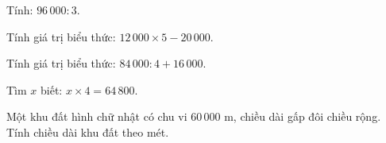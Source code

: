\begin{ex} %
Tính: $96\,000 : 3$.
\end{ex}

\begin{ex} %
Tính giá trị biểu thức: $12\,000 \times 5 - 20\,000$.
\end{ex}

\begin{ex} %
Tính giá trị biểu thức: $84\,000 : 4 + 16\,000$.
\end{ex}

\begin{ex} %
Tìm $x$ biết: $x \times 4 = 64\,800$.
\end{ex}

\begin{ex} %
Một khu đất hình chữ nhật có chu vi $60\,000\text{ m}$, chiều dài gấp đôi chiều rộng. Tính chiều dài khu đất theo mét.
\end{ex}
